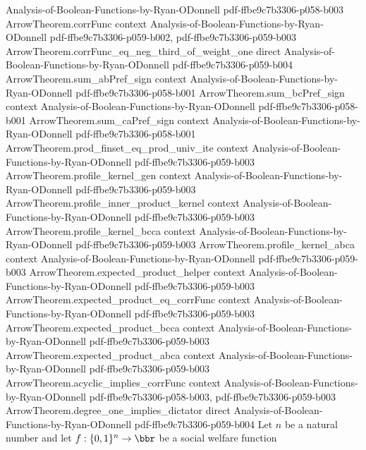 \begin{theorem}
  {Analysis-of-Boolean-Functions-by-Ryan-ODonnell}
  {pdf-ffbe9c7b3306-p058-b003}
\proofstep
  {ArrowTheorem.corrFunc}
  {context}
  {Analysis-of-Boolean-Functions-by-Ryan-ODonnell}
  {pdf-ffbe9c7b3306-p059-b002,
    pdf-ffbe9c7b3306-p059-b003}
\proofstep
  {ArrowTheorem.corrFunc_eq_neg_third_of_weight_one}
  {direct}
  {Analysis-of-Boolean-Functions-by-Ryan-ODonnell}
  {pdf-ffbe9c7b3306-p059-b004}
\proofstep
  {ArrowTheorem.sum_abPref_sign}
  {context}
  {Analysis-of-Boolean-Functions-by-Ryan-ODonnell}
  {pdf-ffbe9c7b3306-p058-b001}
\proofstep
  {ArrowTheorem.sum_bcPref_sign}
  {context}
  {Analysis-of-Boolean-Functions-by-Ryan-ODonnell}
  {pdf-ffbe9c7b3306-p058-b001}
\proofstep
  {ArrowTheorem.sum_caPref_sign}
  {context}
  {Analysis-of-Boolean-Functions-by-Ryan-ODonnell}
  {pdf-ffbe9c7b3306-p058-b001}
\proofstep
  {ArrowTheorem.prod_finset_eq_prod_univ_ite}
  {context}
  {Analysis-of-Boolean-Functions-by-Ryan-ODonnell}
  {pdf-ffbe9c7b3306-p059-b003}
\proofstep
  {ArrowTheorem.profile_kernel_gen}
  {context}
  {Analysis-of-Boolean-Functions-by-Ryan-ODonnell}
  {pdf-ffbe9c7b3306-p059-b003}
\proofstep
  {ArrowTheorem.profile_inner_product_kernel}
  {context}
  {Analysis-of-Boolean-Functions-by-Ryan-ODonnell}
  {pdf-ffbe9c7b3306-p059-b003}
\proofstep
  {ArrowTheorem.profile_kernel_bcca}
  {context}
  {Analysis-of-Boolean-Functions-by-Ryan-ODonnell}
  {pdf-ffbe9c7b3306-p059-b003}
\proofstep
  {ArrowTheorem.profile_kernel_abca}
  {context}
  {Analysis-of-Boolean-Functions-by-Ryan-ODonnell}
  {pdf-ffbe9c7b3306-p059-b003}
\proofstep
  {ArrowTheorem.expected_product_helper}
  {context}
  {Analysis-of-Boolean-Functions-by-Ryan-ODonnell}
  {pdf-ffbe9c7b3306-p059-b003}
\proofstep
  {ArrowTheorem.expected_product_eq_corrFunc}
  {context}
  {Analysis-of-Boolean-Functions-by-Ryan-ODonnell}
  {pdf-ffbe9c7b3306-p059-b003}
\proofstep
  {ArrowTheorem.expected_product_bcca}
  {context}
  {Analysis-of-Boolean-Functions-by-Ryan-ODonnell}
  {pdf-ffbe9c7b3306-p059-b003}
\proofstep
  {ArrowTheorem.expected_product_abca}
  {context}
  {Analysis-of-Boolean-Functions-by-Ryan-ODonnell}
  {pdf-ffbe9c7b3306-p059-b003}
\proofstep
  {ArrowTheorem.acyclic_implies_corrFunc}
  {context}
  {Analysis-of-Boolean-Functions-by-Ryan-ODonnell}
  {pdf-ffbe9c7b3306-p058-b003,
    pdf-ffbe9c7b3306-p059-b003}
\proofstep
  {ArrowTheorem.degree_one_implies_dictator}
  {direct}
  {Analysis-of-Boolean-Functions-by-Ryan-ODonnell}
  {pdf-ffbe9c7b3306-p059-b004}
Let $n$ be a natural number and let $f:\{0,1\}^n\to\bbr$ be a social welfare function

\end{theorem}
